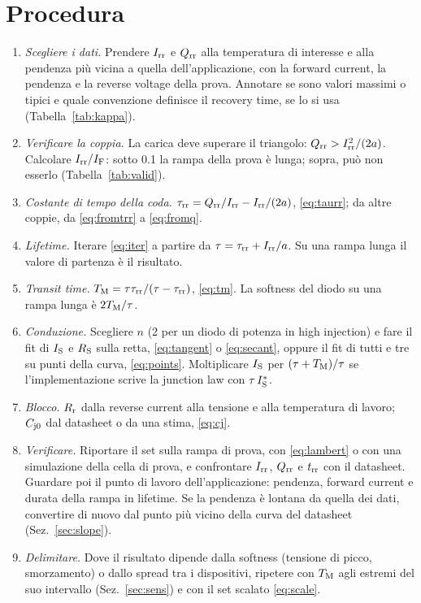 \documentclass[10pt,a4paper]{scrartcl}
\let\newcommand\lmitdefine
\newcommand{\IF}{I_\mathrm{F}}
\newcommand{\Irr}{I_\mathrm{rr}}
\newcommand{\Qrr}{Q_\mathrm{rr}}
\newcommand{\trr}{t_\mathrm{rr}}
\newcommand{\taurr}{\tau_\mathrm{rr}}
\newcommand{\TM}{T_\mathrm{M}}
\newcommand{\IS}{I_\mathrm{S}}
\newcommand{\RS}{R_\mathrm{S}}
\newcommand{\Rr}{R_\mathrm{r}}
\newcommand{\Cjo}{C_\mathrm{j0}}
\begin{document}
\section{Procedura}
\label{sec:procedure}
\begin{enumerate}
\item \emph{Scegliere i dati.} Prendere $\Irr$ e $\Qrr$ alla temperatura di interesse e alla pendenza più vicina a quella dell'applicazione, con la forward current, la pendenza e la reverse voltage della prova. Annotare se sono valori massimi o tipici e quale convenzione definisce il recovery time, se lo si usa (Tabella~\ref{tab:kappa}).
\item \emph{Verificare la coppia.} La carica deve superare il triangolo: $\Qrr > \Irr^2/(2a)$. Calcolare $\Irr/\IF$: sotto \num{0.1} la rampa della prova è lunga; sopra, può non esserlo (Tabella~\ref{tab:valid}).
\item \emph{Costante di tempo della coda.} $\taurr = \Qrr/\Irr - \Irr/(2a)$, \eqref{eq:taurr}; da altre coppie, da \eqref{eq:fromtrr} a \eqref{eq:fromq}.
\item \emph{Lifetime.} Iterare \eqref{eq:iter} a partire da $\tau = \taurr + \Irr/a$. Su una rampa lunga il valore di partenza è il risultato.
\item \emph{Transit time.} $\TM = \tau\taurr/(\tau-\taurr)$, \eqref{eq:tm}. La softness del diodo su una rampa lunga è $2\TM/\tau$.
\item \emph{Conduzione.} Scegliere $n$ (2 per un diodo di potenza in high injection) e fare il fit di $\IS$ e $\RS$ sulla retta, \eqref{eq:tangent} o \eqref{eq:secant}, oppure il fit di tutti e tre su punti della curva, \eqref{eq:points}. Moltiplicare $\IS$ per $(\tau+\TM)/\tau$ se l'implementazione scrive la junction law con $\tau\,\IS^{*}$.
\item \emph{Blocco.} $\Rr$ dalla reverse current alla tensione e alla temperatura di lavoro; $\Cjo$ dal datasheet o da una stima, \eqref{eq:cj}.
\item \emph{Verificare.} Riportare il set sulla rampa di prova, con \eqref{eq:lambert} o con una simulazione della cella di prova, e confrontare $\Irr$, $\Qrr$ e $\trr$ con il datasheet. Guardare poi il punto di lavoro dell'applicazione: pendenza, forward current e durata della rampa in lifetime. Se la pendenza è lontana da quella dei dati, convertire di nuovo dal punto più vicino della curva del datasheet (Sez.~\ref{sec:slope}).
\item \emph{Delimitare.} Dove il risultato dipende dalla softness (tensione di picco, smorzamento) o dallo spread tra i dispositivi, ripetere con $\TM$ agli estremi del suo intervallo (Sez.~\ref{sec:sens}) e con il set scalato \eqref{eq:scale}.
\end{enumerate}
\end{document}
